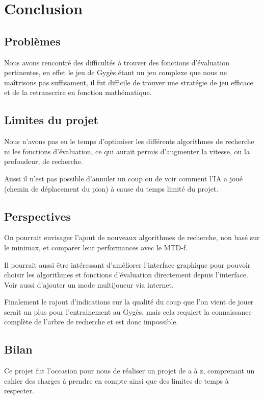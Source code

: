 \chapter{Conclusion}

	\section{Problèmes}
		Nous avons rencontré des difficultés à trouver des
		fonctions d'évaluation pertinentes, en effet le jeu
		de Gygès étant un jeu complexe que nous ne maîtrisons
		pas suffisament, il fut difficile de trouver une
		stratégie de jeu efficace et de la retranscrire en
		fonction mathématique.

	\section{Limites du projet}
		Nous n'avons pas eu le temps d'optimiser les différents algorithmes
		de recherche ni les fonctions d'évaluation, ce qui aurait permis
		d'augmenter la vitesse, ou la profondeur, de recherche.

		\vspace{1em}
		Aussi il n'est pas possible d'annuler un coup ou de voir
		comment l'IA a joué (chemin de déplacement du pion) à cause du
		temps limité du projet.

	\section{Perspectives}
		On pourrait envisager l'ajout de nouveaux algorithmes de
		recherche, non basé sur le minimax, et comparer leur
		performances avec le MTD-f.

		\vspace{1em}
		Il pourrait aussi être intéressant d'améliorer l'interface
		graphique pour pouvoir choisir les algorithmes et fonctions
		d'évaluation directement depuis l'interface. Voir aussi
		d'ajouter un mode multijoueur via internet.

		\vspace{1em}
		Finalement le rajout d'indications sur la qualité du coup
		que l'on vient de jouer serait un plus pour l'entrainement
		au Gygès, mais cela requiert la connaissance complète de
		l'arbre de recherche et est donc impossible.

	\section{Bilan}
		Ce projet fut l'occasion pour nous de réaliser un projet de a à z,
		comprenant un cahier des charges à prendre en compte ainsi que des
		limites de temps à respecter.

